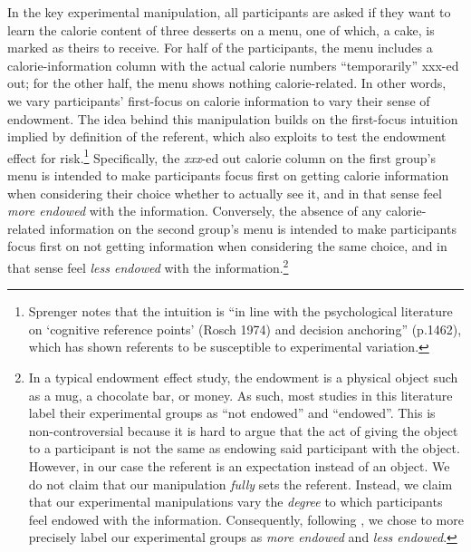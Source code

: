 
In the key experimental manipulation, all participants are asked if they want to learn the calorie content of three desserts on a menu, one of which, a cake, is marked as theirs to receive. For half of the participants, the menu includes a calorie-information column with the actual calorie numbers “temporarily” xxx-ed out; for the other half, the menu shows nothing calorie-related. In other words, we vary participants’ first-focus on calorie information to vary their sense of endowment. The idea behind this manipulation builds on the first-focus intuition implied by  definition of the referent, which \citet{sprengerEndowmentEffectRisk2015} also exploits to test the endowment effect for risk.\footnote{Sprenger notes that the intuition is \enquote{in line with the psychological literature on \enquote{cognitive reference points} (Rosch 1974) and decision anchoring} (p.1462), which has shown referents to be susceptible to experimental variation.} Specifically, the \emph{xxx}-ed out calorie column on the first group's menu is intended to make participants focus first on getting calorie information when considering their choice whether to actually see it, and in that sense feel \emph{more endowed} with the information. Conversely, the absence of any calorie-related information on the second group's menu is intended to make participants focus first on not getting information when considering the same choice, and in that sense feel \emph{less endowed} with the information.\footnote{In a typical endowment effect study, the endowment is a physical object such as a mug, a chocolate bar, or money. As such, most studies in this literature label their experimental groups as \enquote{not endowed} and \enquote{endowed}. This is non-controversial because it is hard to argue that the act of giving the object to a participant is not the same as endowing said participant with the object. However, in our case the referent is an expectation instead of an object. We do not claim that our manipulation \emph{fully} sets the referent. Instead, we claim that our experimental manipulations vary the \emph{degree} to which participants feel endowed with the information. Consequently, following \citet{heffetzEndowmentEffectExpectations2014}, we chose to more precisely label our experimental groups as \emph{more endowed} and \emph{less endowed}.}


